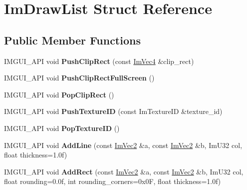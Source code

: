 \hypertarget{struct_im_draw_list}{}\section{Im\+Draw\+List Struct Reference}
\label{struct_im_draw_list}
\subsection*{Public Member Functions}
\begin{DoxyCompactItemize}
\item 
\mbox{\label{struct_im_draw_list_a87e19224a2628a6c6dae483b33b59c87}} 
I\+M\+G\+U\+I\+\_\+\+A\+PI void {\bfseries Push\+Clip\+Rect} (const \mbox{\hyperlink{struct_im_vec4}{Im\+Vec4}} \&clip\+\_\+rect)
\item 
\mbox{\label{struct_im_draw_list_a487aa3b1496dac28060baaaea593d23d}} 
I\+M\+G\+U\+I\+\_\+\+A\+PI void {\bfseries Push\+Clip\+Rect\+Full\+Screen} ()
\item 
\mbox{\label{struct_im_draw_list_a717568372b45f1088036abd35315ca77}} 
I\+M\+G\+U\+I\+\_\+\+A\+PI void {\bfseries Pop\+Clip\+Rect} ()
\item 
\mbox{\label{struct_im_draw_list_a07e9041d53c2d1204774ca7c13b061f1}} 
I\+M\+G\+U\+I\+\_\+\+A\+PI void {\bfseries Push\+Texture\+ID} (const Im\+Texture\+ID \&texture\+\_\+id)
\item 
\mbox{\label{struct_im_draw_list_af7dff1e6fd55e868107b4b52c66cd02a}} 
I\+M\+G\+U\+I\+\_\+\+A\+PI void {\bfseries Pop\+Texture\+ID} ()
\item 
\mbox{\label{struct_im_draw_list_a2d5b8eb5ae58ef58c370a8c9b6154f2a}} 
I\+M\+G\+U\+I\+\_\+\+A\+PI void {\bfseries Add\+Line} (const \mbox{\hyperlink{struct_im_vec2}{Im\+Vec2}} \&a, const \mbox{\hyperlink{struct_im_vec2}{Im\+Vec2}} \&b, Im\+U32 col, float thickness=1.\+0f)
\item 
\mbox{\label{struct_im_draw_list_afcbce9cf6ccd4db612528d218b0545fa}} 
I\+M\+G\+U\+I\+\_\+\+A\+PI void {\bfseries Add\+Rect} (const \mbox{\hyperlink{struct_im_vec2}{Im\+Vec2}} \&a, const \mbox{\hyperlink{struct_im_vec2}{Im\+Vec2}} \&b, Im\+U32 col, float rounding=0.\+0f, int rounding\+\_\+corners=0x0\+F, float thickness=1.\+0f)

\end{DoxyCompactItemize}
